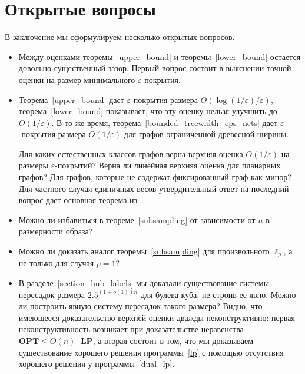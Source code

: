 \documentclass[12pt]{article}
\newcommand{\eps}{\varepsilon}
\begin{document}
    \section{Открытые вопросы}
    В заключение мы сформулируем несколько открытых вопросов.
    \begin{itemize}

        \item
        Между оценками теоремы~\ref{upper_bound} и теоремы~\ref{lower_bound} остается довольно существенный зазор.
        Первый вопрос состоит в выяснении точной оценки на размер минимального $\eps$-покрытия.

        \item
        Теорема~\ref{upper_bound} дает $\eps$-покрытия размера $O(\log(1 / \eps) / \eps)$, теорема~\ref{lower_bound}
        показывает, что эту оценку нельзя улучшить до $O(1 / \eps)$. В то же время,
        теорема~\ref{bounded_treewidth_eps_nets} дает
        $\eps$-покрытия размера $O(1 / \eps)$ для графов ограниченной древесной ширины.

        Для каких естественных классов графов верна верхняя оценка $O(1 / \eps)$ на размеры $\eps$-покрытий?
        Верна ли линейная верхняя оценка для планарных графов?
        Для графов, которые не содержат фиксированный граф как минор?
        Для частного случая единичных весов утвердительный ответ на последний вопрос дает основная теорема из~\cite{KPR93}.
        \item
        Можно ли избавиться в теореме~\ref{subsampling} от зависимости от $n$ в размерности образа?

        \item
        Можно ли доказать аналог теоремы~\ref{subsampling} для произвольного $\ell_p$, а не только для случая $p = 1$?
        \item
        В разделе~\ref{section_hub_labels} мы доказали существование системы пересадок размера $2.5^{(1+o(1))n}$ для
        булева куба, не строив ее явно.
        Можно ли построить явную систему пересадок такого размера?
        Видно, что имеющееся доказательство верхней оценки дважды неконструктивно: первая неконструктивность возникает при доказательстве неравенства
        $\mathbf{OPT} \leq O(n) \cdot \mathbf{LP}$, а вторая состоит в том, что мы доказываем существование хорошего решения программы~\ref{lp}
        с помощью отсутствия хорошего решения у программы~\ref{dual_lp}.
    \end{itemize}
    
    
\end{document}
